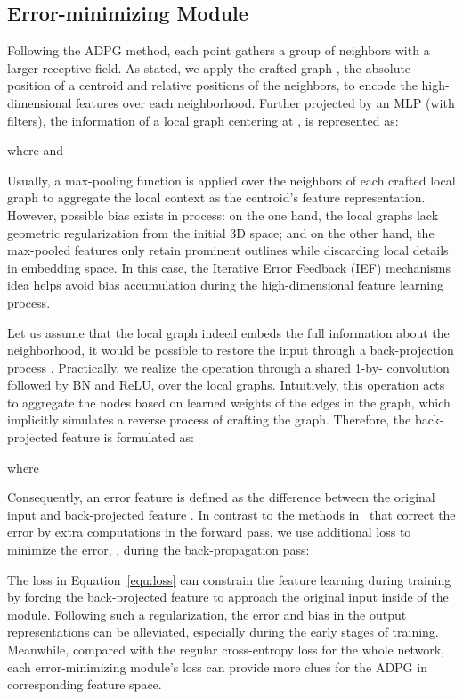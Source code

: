 \documentclass[10pt,twocolumn,letterpaper]{article}
\begin{document}
\subsection{Error-minimizing Module}
\label{sec:error}
Following the ADPG method, each point gathers a group of neighbors with a larger receptive field. As stated, we apply the crafted graph , \ie the absolute position of a centroid and relative positions of the neighbors, to encode the high-dimensional features over each neighborhood. Further projected by an MLP (with  filters), the information of a local graph centering at , is represented as:

where  and 

Usually, a max-pooling function is applied over the  neighbors of each crafted local graph to aggregate the local context as the centroid's feature representation. However, possible bias exists in process: on the one hand, the local graphs lack geometric regularization from the initial 3D space; and on the other hand, the max-pooled features only retain prominent outlines while discarding local details in embedding space. In this case, the Iterative Error Feedback (IEF) mechanisms idea helps avoid bias accumulation during the high-dimensional feature learning process.

Let us assume that the local graph  indeed embeds the full information about the neighborhood, it would be possible to restore the input  through a back-projection process . Practically, we realize the  operation through a shared 1-by- convolution followed by BN and ReLU, over the local graphs. Intuitively, this operation acts to aggregate the nodes based on learned weights of the edges in the graph, which implicitly simulates a reverse process of crafting the graph. Therefore, the back-projected feature  is formulated as:

where 

Consequently, an error feature  is defined as the difference between the original input  and back-projected feature . In contrast to the methods in~\cite{Li_2019_ICCV, qiu2019geometric, haris2018deep, liu2019hierarchical} that correct the error by extra computations in the forward pass, we use additional  loss to minimize the error, , during the back-propagation pass:


The loss in Equation~\ref{equ:loss} can constrain the feature learning during training by forcing the back-projected feature  to approach the original input  inside of the module. Following such a regularization, the error and bias in the output representations can be alleviated, especially during the early stages of training. Meanwhile, compared with the regular cross-entropy loss for the whole network, each error-minimizing module's loss can provide more clues for the ADPG in corresponding feature space.
\end{document}
